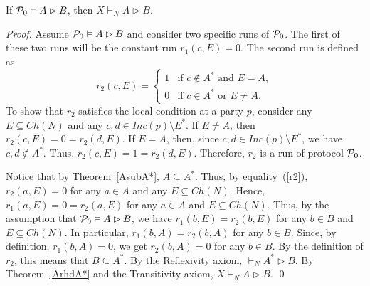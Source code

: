 \documentclass{llncs}
\newcommand{\pp}{{\cal P}}
\begin{document}
\begin{theorem}\label{th1}
If $\pp_0 \vDash A\rhd B$, then $X \vdash_N A\rhd B$.
\end{theorem}
\begin{proof} 
Assume $\pp_0 \vDash A\rhd B$ and consider two specific runs of $\pp_0$.
The first of these two runs will be the constant run $r_1(c,E)=0$. The second run is defined as
\begin{equation}\label{r2}
r_2(c,E)=\left\{\begin{array}{ll}
                            1     & \mbox{if $c\notin A^*$ and $E=A$},\\
                            0     & \mbox{if $c\in A^*$ or $E\neq A$}.
                            \end{array}
                     \right.
\end{equation}
To show that $r_2$ satisfies the local condition at a party $p$, consider any $E\subseteq Ch(N)$ and 
any $c,d\in Inc(p)\setminus E^*$. If $E\neq A$, then $r_2(c,E)=0=r_2(d,E)$. If $E=A$, then, since $c,d\in Inc(p)\setminus E^*$, we have 
$c,d\notin A^*$. Thus, $r_2(c,E)=1=r_2(d,E)$. Therefore, $r_2$ is a run of protocol $\pp_0$.

Notice that by Theorem~\ref{AsubA*}, $A\subseteq A^*$. Thus, by equality~(\ref{r2}), $r_2(a,E)=0$ for any $a\in A$ and any $E\subseteq Ch(N)$. Hence, $r_1(a,E)=0=r_2(a,E)$ for any $a\in A$ and $E\subseteq Ch(N)$. Thus, by the assumption that $\pp_0 \vDash A\rhd B$, we have $r_1(b,E)=r_2(b,E)$ for any $b\in B$ and $E\subseteq Ch(N)$. In particular, $r_1(b,A)=r_2(b,A)$ for any $b\in B$.
Since, by definition, $r_1(b,A)=0$, we get $r_2(b,A)=0$ for any $b\in B$. By the definition of $r_2$, this means that
$B\subseteq A^*$. By the Reflexivity axiom, $\vdash_N A^*\rhd B$. By Theorem~\ref{ArhdA*} and the Transitivity axiom, $X\vdash_N A\rhd B$.
\qed 

\end{proof}
\end{document}
